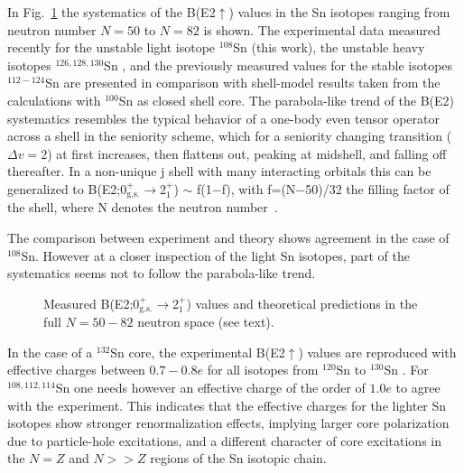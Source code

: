 \documentclass[prc,twocolumn,amssymb,amsmath,showpacs,superscriptaddress]{revtex4}
\begin{document}
In Fig.~\ref{fig:systematics1} the systematics of the
B(E2$\uparrow$) values in the Sn isotopes ranging from neutron
number $N = 50$ to $N = 82$ is shown. The experimental data
measured recently for the unstable light isotope $^{108}$Sn (this
work), the unstable heavy isotopes $^{126,128,130}$Sn
\cite{rad04}, and the previously measured values for the stable
isotopes $^{112-124}$Sn \cite{ram01} are presented in comparison
with shell-model results taken from the calculations with
$^{100}$Sn as closed shell core. The parabola-like trend of the
B(E2) systematics resembles the typical behavior of a one-body
even tensor operator across a shell in the seniority scheme, which
for a seniority changing transition ($\Delta v = 2$) at first
increases, then flattens out, peaking at midshell, and falling off
thereafter. In a non-unique j shell with many interacting orbitals
this can be generalized to
B(E2;0$^{+}_{\text{g.s.}}$$\to$2$^{+}_{1}$) $\sim$ f(1$-$f), with
f=(N$-$50)/32 the filling factor of the shell, where N denotes the
neutron number~\cite{hol98, tal77}.

The comparison between experiment and theory shows agreement in
the case of $^{108}$Sn. However at a closer inspection of the
light Sn isotopes, part of the systematics seems not to follow the
parabola-like trend.
\begin{figure}[htb]\hspace{-0.9cm}
\centering\mbox{}
\vspace{-15pt} \caption{\small Measured
B(E2;0$^{+}_{\text{g.s.}}$$\to$2$^{+}_{1}$) values and theoretical
predictions in the full $N=50-82$ neutron space (see text).
}\label{fig:systematics1}
\end{figure}

In the case of a $^{132}$Sn core, the experimental B(E2$\uparrow$)
values are reproduced with effective charges between $0.7-0.8e$
for all isotopes from $^{120}$Sn to $^{130}$Sn \cite{hol98}. For
$^{108,112,114}$Sn one needs however an effective charge of the
order of $1.0e$ to agree with the experiment. This indicates that
the effective charges for the lighter Sn isotopes show stronger
renormalization effects, implying larger core polarization due to
particle-hole excitations, and a different character of core
excitations in the $N = Z$ and $N >> Z$ regions of the Sn isotopic
chain.
\end{document}
